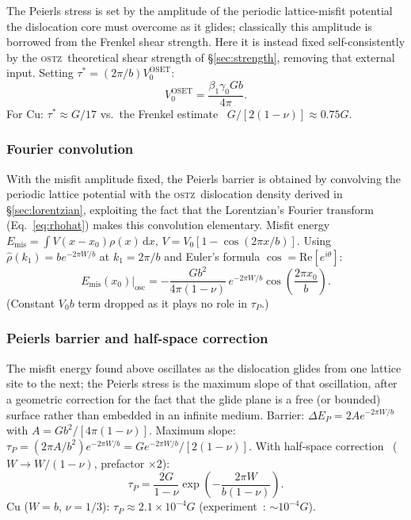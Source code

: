 \documentclass[5p,sort&compress]{elsarticle}
\newcommand{\OSTZ}{\textsc{ostz}}
\newcommand{\gz}{\gamma_0}
\begin{document}
The Peierls stress is set by the amplitude of the periodic
lattice-misfit potential the dislocation core must overcome as it
glides; classically this amplitude is borrowed from the Frenkel
shear strength. Here it is instead fixed self-consistently by the
\OSTZ\ theoretical shear strength of \S\ref{sec:strength}, removing
that external input. Setting $\tau^*=(2\pi/b)V_0^\text{OSET}$:
\begin{equation}
  V_0^\text{OSET}=\frac{\beta_1\gz Gb}{4\pi}.
  \label{eq:V0OSET}
\end{equation}
For Cu: $\tau^*\approx G/17$ vs.\ the Frenkel estimate~\cite{frenkel1926} $G/[2(1-\nu)]\approx0.75G$.

\subsubsection{Fourier convolution}

With the misfit amplitude fixed, the Peierls barrier is obtained by
convolving the periodic lattice potential with the \OSTZ\ dislocation
density derived in \S\ref{sec:lorentzian}, exploiting the fact that
the Lorentzian's Fourier transform (Eq.~\eqref{eq:rhohat}) makes this
convolution elementary.
Misfit energy $E_\text{mis}=\int V(x-x_0)\rho(x)\,\mathrm dx$,
$V=V_0[1-\cos(2\pi x/b)]$.
Using $\hat\rho(k_1)=be^{-2\pi W/b}$ at $k_1=2\pi/b$
and Euler's formula $\cos=\mathrm{Re}[e^{i\theta}]$:
\begin{equation}
  E_\text{mis}(x_0)\big|_\text{osc}=
  -\frac{Gb^2}{4\pi(1-\nu)}\,e^{-2\pi W/b}
  \cos\!\left(\frac{2\pi x_0}{b}\right).
  \label{eq:Emisfit}
\end{equation}
(Constant $V_0 b$ term dropped as it plays no role in $\tau_P$.)

\subsubsection{Peierls barrier and half-space correction}

The misfit energy found above oscillates as the dislocation glides
from one lattice site to the next; the Peierls stress is the
maximum slope of that oscillation, after a geometric correction for
the fact that the glide plane is a free (or bounded) surface rather
than embedded in an infinite medium.
Barrier: $\Delta E_P=2Ae^{-2\pi W/b}$ with $A=Gb^2/[4\pi(1-\nu)]$.
Maximum slope: $\tau_P=(2\pi A/b^2)e^{-2\pi W/b}=G e^{-2\pi W/b}/[2(1-\nu)]$.
With half-space correction~\cite{peierls1940} ($W\to W/(1-\nu)$, prefactor $\times2$):
\begin{equation}
  \boxed{\tau_P=\frac{2G}{1-\nu}
  \exp\!\left(-\frac{2\pi W}{b(1-\nu)}\right).}
  \label{eq:peierls}
\end{equation}
Cu ($W=b$, $\nu=1/3$): $\tau_P\approx2.1\times10^{-4}G$
(experiment~\cite{nabarro1997}: $\sim10^{-4}G$).
\end{document}
